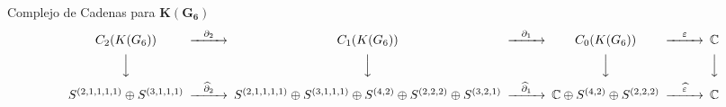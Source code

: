 \documentclass[final,xcolor=svgnames]{beamer}
\begin{document}
\begin{frame}{}
  \begin{block}{Complejo de Cadenas para $\boldsymbol{K(G_{6})}$}
    \[
    \begin{CD}
      C_{2}(K(G_{6})) @>{\partial_{2}}>> C_{1}(K(G_{6})) @>{\partial_{1}}>> C_{0}(K(G_{6})) @>{\varepsilon}>> \mathbb{C}\\
      @VVV   @VVV   @VVV   @VVV    \\
      S^{(2,1,1,1,1)}\oplus S^{(3,1,1,1)} @>{\widehat\partial_{2}}>>
      S^{(2,1,1,1,1)}\oplus S^{(3,1,1,1)}\oplus S^{(4,2)}\oplus S^{(2,2,2)}\oplus S^{(3,2,1)} @>{\widehat\partial_{1}}>> 
      \mathbb{C} \oplus S^{(4,2)}\oplus S^{(2,2,2)} @>{\widehat \varepsilon}>>  \mathbb{C}
    \end{CD}
    \]
  \end{block}
\end{frame}
\end{document}
